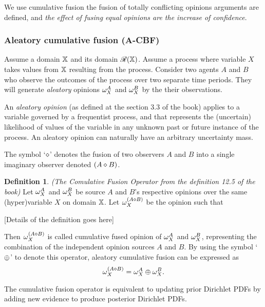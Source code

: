 \documentclass[a4paper,12pt]{article}
\theoremstyle{definition}
\newtheorem{definition}{Definition}[section]
\theoremstyle{theorem}
\numberwithin{equation}{section}
\begin{document}
We use cumulative fusion the fusion of totally conflicting opinions arguments are defined, and \emph{the effect of fusing equal opinions are the increase of confidence}.


\subsubsection{Aleatory cumulative fusion (A-CBF)}
\label{sec:acbf}

Assume a domain $\mathbb{X}$ and its domain $\mathcal{R}(\mathbb{X})$. Assume a process where variable $X$ takes values from $\mathbb{X}$ resulting from the process. Consider two agents $A$ and $B$ who observe the outcomes of the process over two separate time periods. They will generate \emph{aleatory} opinions $\omega^{A}_{X}$ and $\omega^{B}_{X}$ by the their observations.

An \emph{aleatory opinion} (as defined at the section 3.3 of the book) applies to a variable governed by a frequentist process, and that represents the (uncertain) likelihood of values of the variable in any unknown past or future instance of the process. An aleatory opinion can naturally have an arbitrary uncertainty mass.

The symbol `$\diamond$' denotes the fusion of two observers $A$ and $B$ into a single imaginary observer denoted $(A \diamond B)$.

\begin{definition}
\emph{(The Comulative Fusion Operator from the definition 12.5 of the book)} Let $\omega^{A}_{X}$ and $\omega^{B}_{X}$ be source $A$ and $B$'s respective opinions over the same (hyper)variable $X$ on domain $\mathbb{X}$. Let $\omega^{(A \diamond B)}_{X}$ be the opinion such that

[Details of the definition goes here]

Then $\omega^{(A \diamond B)}_{X}$ is called cumulative fused opinion of $\omega^{A}_{X}$ and $\omega^{B}_{X}$, representing the combination of the independent opinion sources $A$ and $B$. By using the symbol `$\oplus$' to denote this operator, aleatory cumulative fusion can be expressed as
\begin{equation}\label{eq:aleatory_cumulative_fusion}
\omega^{(A \diamond B)}_{X} = \omega^{A}_{X} \oplus \omega^{B}_{X}.
\end{equation} 
\end{definition}

The cumulative fusion operator is equivalent to updating prior Dirichlet PDFs by adding new evidence to produce posterior Dirichlet PDFs.
\end{document}
